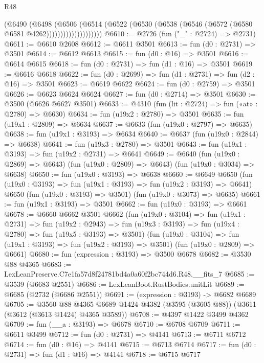 \begin{lexlean}{R48}
\begin{coremodule}
                        (@6490
                          (@6498
                            (@6506
                              (@6514
                                (@6522
                                  (@6530 (@6538 (@6546 (@6572 (@6580 @6581 @4262))))))))))))))))))))
@6610 := @2726 (fun ("_" : @2724) => @2731)
@6611 := @6610 @2608
@6612 := @6611 @3501
@6613 := fun (d0 : @2731) => @3501
@6614 := @6612 @6613
@6615 := fun (d0 : @16) => @3501
@6616 := @6614 @6615
@6618 := fun (d0 : @2731) => fun (d1 : @16) => @3501
@6619 := @6616 @6618
@6622 := fun (d0 : @2699) => fun (d1 : @2731) => fun (d2 : @16) => @3501
@6623 := @6619 @6622
@6624 := fun (d0 : @2759) => @3501
@6626 := @6623 @6624 @6624
@6627 := fun (d0 : @2714) => @3501
@6630 := @3500 (@6626 @6627 @3501)
@6633 := @4310 (fun (lit : @2724) => fun («at» : @2780) => @6630)
@6634 := fun (u19x2 : @2780) => @3501
@6635 := fun (u19x1 : @2809) => @6634
@6637 := @6633 (fun (u19x0 : @2797) => @6635)
@6638 := fun (u19x1 : @3193) => @6634
@6640 := @6637 (fun (u19x0 : @2844) => @6638)
@6641 := fun (u19x3 : @2780) => @3501
@6643 := fun (u19x1 : @3193) => fun (u19x2 : @2731) => @6641
@6649 := @6640
    (fun (u19x0 : @2869) => @6643)
    (fun (u19x0 : @2809) => @6643)
    (fun (u19x0 : @3034) => @6638)
@6650 := fun (u19x0 : @3193) => @6638
@6660 := @6649
    @6650
    (fun (u19x0 : @3193) => fun (u19x1 : @3193) => fun (u19x2 : @3193) => @6641)
    @6650
    (fun (u19x0 : @3193) => @3501)
    (fun (u19x0 : @3073) => @6635)
@6661 := fun (u19x1 : @3193) => @3501
@6662 := fun (u19x0 : @3193) => @6661
@6678 := @6660
    @6662
    @3501
    @6662
    (fun (u19x0 : @3104) =>
    fun (u19x1 : @2731) =>
    fun (u19x2 : @2943) =>
    fun (u19x3 : @3193) => fun (u19x4 : @2780) => fun (u19x5 : @3193) => @3501)
    (fun (u19x0 : @3104) => fun (u19x1 : @3193) => fun (u19x2 : @3193) => @3501)
    (fun (u19x0 : @2809) => @6661)
@6680 := fun (expression : @3193) => @3500 @6678
@6682 := @3530 @88 @4365
@6683 := LexLeanPreserve.C7e1fa57d8f24781bd4a0a60f2bc744d6.R48.__fits_7
@6685 := @3539 (@6683 @2551)
@6686 := LexLeanBoot.RustBodies.unitLit
@6689 := @6685 (@2732 (@6686 @2551))
@6691 := (expression : @3193) -> @6682 @6689
@6705 := @3560
    @88
    @4365
    @6689
    @1424
    @4382
    (@3595 (@3605 @88))
    (@3611 (@3612 (@3613 @1424) @4365 @3589))
@6708 := @4397 @1422 @3499 @4362
@6709 := fun (__a : @3193) => @6678
@6710 := @6708 @6709
@6711 := @6611 @3499
@6712 := fun (d0 : @2731) => @4141
@6713 := @6711 @6712
@6714 := fun (d0 : @16) => @4141
@6715 := @6713 @6714
@6717 := fun (d0 : @2731) => fun (d1 : @16) => @4141
@6718 := @6715 @6717

\end{coremodule}
\end{lexlean}
